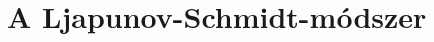 \documentclass[oneside, titlepage, 12pt, a4paper]{report}
\begin{document}

\onehalfspacing
\chapter{A Ljapunov-Schmidt-módszer}
\label{chap:modszer}


 

 
\end{document}
